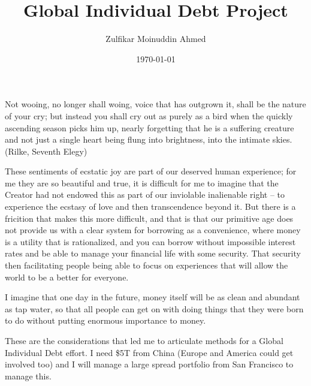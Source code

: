 \documentclass{amsart}
\title{Global Individual Debt Project}
\author{Zulfikar Moinuddin Ahmed}
\date{\today}
\begin{document}
\maketitle

Not wooing, no longer shall woing, voice that has outgrown it, shall be the nature of your cry; but instead you shall cry out as purely as a bird when the quickly ascending season picks him up, nearly forgetting that he is a suffering creature and not just a single heart being flung into brightness, into the intimate skies.
(Rilke, Seventh Elegy)

These sentiments of ecstatic joy are part of our deserved human experience; for me they are so beautiful and true, it is difficult for me to imagine that the Creator had not endowed this as part of our inviolable inalienable right -- to experience the ecstasy of love and then transcendence beyond it.  But there is a fricition that makes this more difficult, and that is that our primitive age does not provide us with a clear system for borrowing as a convenience, where money is a utility that is rationalized, and you can borrow without impossible interest rates and be able to manage your financial life with some security.  That security then facilitating people being able to focus on experiences that will allow the world to be a better for everyone.  

I imagine that one day in the future, money itself will be as clean and abundant as tap water, so that all people can get on with doing things that they were born to do without putting enormous importance to money.  

These are the considerations that led me to articulate methods for a Global Individual Debt effort.  I need \$5T from China (Europe and America could get involved too) and I will manage a large spread portfolio from San Francisco to manage this.
\end{document}
